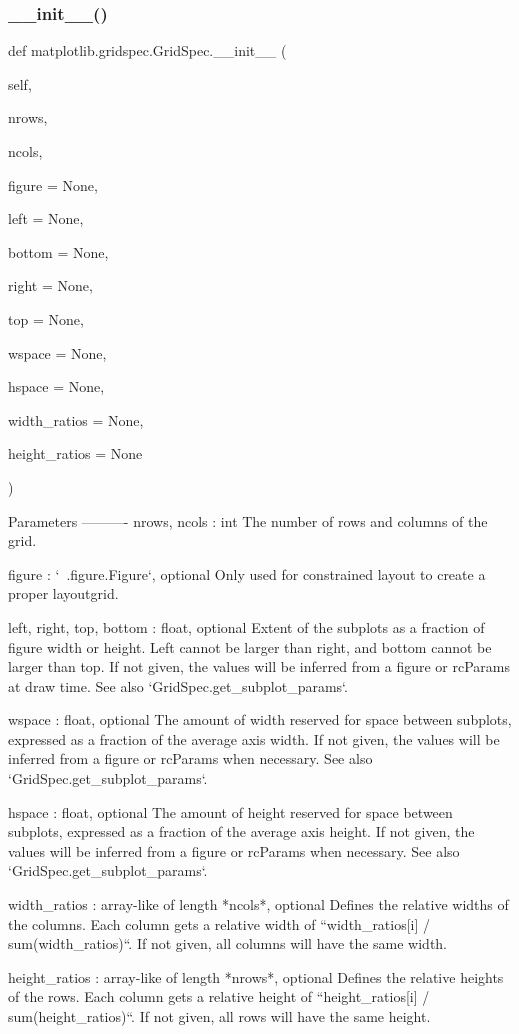 \subsubsection{\texorpdfstring{\+\_\+\+\_\+init\+\_\+\+\_\+()}{\_\_init\_\_()}}
{\footnotesize\ttfamily def matplotlib.\+gridspec.\+Grid\+Spec.\+\_\+\+\_\+init\+\_\+\+\_\+ (\begin{DoxyParamCaption}\item[{}]{self,  }\item[{}]{nrows,  }\item[{}]{ncols,  }\item[{}]{figure = {\ttfamily None},  }\item[{}]{left = {\ttfamily None},  }\item[{}]{bottom = {\ttfamily None},  }\item[{}]{right = {\ttfamily None},  }\item[{}]{top = {\ttfamily None},  }\item[{}]{wspace = {\ttfamily None},  }\item[{}]{hspace = {\ttfamily None},  }\item[{}]{width\+\_\+ratios = {\ttfamily None},  }\item[{}]{height\+\_\+ratios = {\ttfamily None} }\end{DoxyParamCaption})}

\begin{DoxyVerb}Parameters
----------
nrows, ncols : int
    The number of rows and columns of the grid.

figure : `~.figure.Figure`, optional
    Only used for constrained layout to create a proper layoutgrid.

left, right, top, bottom : float, optional
    Extent of the subplots as a fraction of figure width or height.
    Left cannot be larger than right, and bottom cannot be larger than
    top. If not given, the values will be inferred from a figure or
    rcParams at draw time. See also `GridSpec.get_subplot_params`.

wspace : float, optional
    The amount of width reserved for space between subplots,
    expressed as a fraction of the average axis width.
    If not given, the values will be inferred from a figure or
    rcParams when necessary. See also `GridSpec.get_subplot_params`.

hspace : float, optional
    The amount of height reserved for space between subplots,
    expressed as a fraction of the average axis height.
    If not given, the values will be inferred from a figure or
    rcParams when necessary. See also `GridSpec.get_subplot_params`.

width_ratios : array-like of length *ncols*, optional
    Defines the relative widths of the columns. Each column gets a
    relative width of ``width_ratios[i] / sum(width_ratios)``.
    If not given, all columns will have the same width.

height_ratios : array-like of length *nrows*, optional
    Defines the relative heights of the rows. Each column gets a
    relative height of ``height_ratios[i] / sum(height_ratios)``.
    If not given, all rows will have the same height.\end{DoxyVerb}
 

